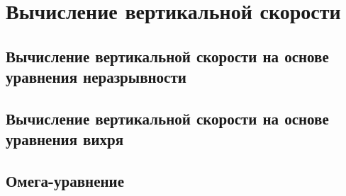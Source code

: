 \chapter{Вычисление вертикальной скорости}

\section{Вычисление вертикальной скорости на основе уравнения неразрывности}

\section{Вычисление вертикальной скорости на основе уравнения вихря}

\section{Омега-уравнение}

